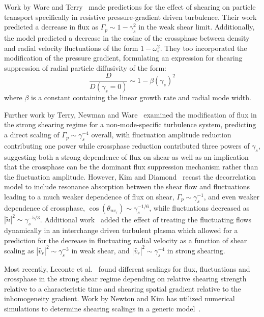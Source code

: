 \documentclass[aip,pop,amsmath,amssymb,preprint,superscriptaddress]{revtex4-1} %
\begin{document}
Work by Ware and Terry~\cite{ware96,ware98} made predictions for the effect of shearing on particle transport specifically in resistive pressure-gradient driven turbulence. Their work predicted a decrease in flux as $\Gamma_{p} \sim 1-\gamma_{s}^2$ in the weak shear limit.  Additionally,  the model predicted a decrease in the cosine of the crossphase between density and radial velocity fluctuations of the form $1-\omega_{s}^2$. They too incorporated the modification of the pressure gradient, formulating an expression for shearing suppression of radial particle diffusivity of the form:
%
\begin{equation}
\frac{D}{D(\gamma_{s}=0)} \sim 1-\beta(\gamma_{s})^2
\label{eq:ware_diff_theory}
\end{equation}
%
where $\beta$ is a constant containing the linear growth rate and radial mode width.

Further work by Terry, Newman and Ware~\cite{terry01} examined the modification of flux in the strong shearing regime for a non-mode-specific turbulence system, predicting a direct scaling of $\Gamma_{p} \sim \gamma_{s}^{-4}$ overall, with fluctuation amplitude reduction contributing one power while crossphase reduction contributed three powers of $\gamma_s$, suggesting both a strong dependence of flux on shear as well as an implication that the crossphase can be the dominant flux suppression mechanism rather than the fluctuation amplitude. However, Kim and Diamond~\cite{kim03} recast the decorrelation model to include resonance absorption between the shear flow and fluctuations leading to a much weaker dependence of flux on shear, $\Gamma_{p} \sim \gamma_{s}^{-1}$, and even weaker dependence of crossphase, $\cos(\theta_{nv_{r}}) \sim \gamma_{s}^{-1/6}$, while fluctuations decreased as $|\tilde{n}|^{2} \sim \gamma_{s}^{-5/3}$. Additional work~\cite{kim04} added the effect of treating the fluctuating flows dynamically in an interchange driven turbulent plasma which allowed for a prediction for the decrease in fluctuating radial velocity as a function of shear scaling as $|\tilde{v_{r}}|^{2} \sim \gamma_{s}^{-3}$ in weak shear, and $|\tilde{v_{r}}|^{2} \sim \gamma_{s}^{-4}$ in strong shearing.

Most recently, Leconte et al.~\cite{leconte06} found different scalings for flux, fluctuations and crossphase in the strong shear regime depending on relative shearing strength relative to a characteristic time and shearing spatial gradient relative to the inhomogeneity gradient. Work by Newton and Kim has utilized numerical simulations to determine shearing scalings in a generic model~\cite{newton07,newton11}.
\end{document}
